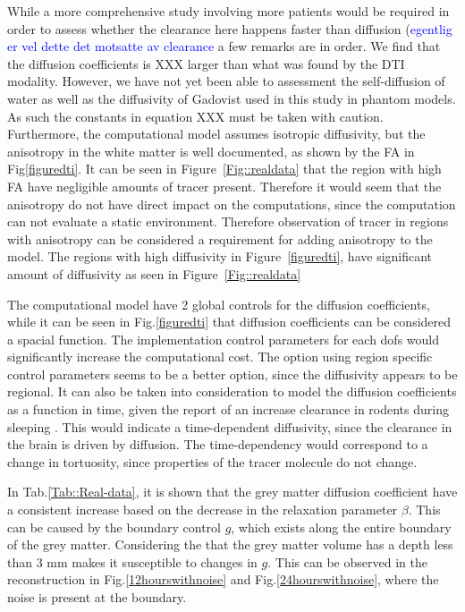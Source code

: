 \documentclass[11pt,a4paper]{article}
\newcommand{\kam}[1]{\textcolor{blue}{#1}}
\begin{document}
While a more comprehensive study involving more patients would be required in order to assess whether the clearance here happens faster than diffusion (\kam{egentlig er
vel dette det motsatte av clearance} a few remarks are in order. We find that the diffusion coefficients is XXX larger than what was found by the DTI modality.  
However, we have not yet been able to assessment the self-diffusion of water as well as the diffusivity of Gadovist used in this study in phantom models. As such 
the constants in equation XXX must be taken with caution. Furthermore,    
the computational model assumes isotropic diffusivity, but the anisotropy in the white matter is well documented, as shown by the FA in Fig\ref{figuredti}. It can be seen in Figure~\ref{Fig::realdata} that the region with high FA have negligible amounts of tracer present. Therefore it would seem that the anisotropy do not have direct impact on the computations, since the computation can not evaluate a static environment. Therefore  observation of tracer in regions with anisotropy can be considered a requirement for adding anisotropy to the model.
The regions with high diffusivity in Figure~\ref{figuredti},  have significant amount of diffusivity as seen in Figure~\ref{Fig::realdata} 


The computational model have 2 global controls for the diffusion coefficients, while it can be seen in  Fig.\ref{figuredti} that diffusion coefficients can be considered a spacial function. The implementation control parameters for each dofs would significantly increase the computational cost. The option using region specific control parameters seems to be a better option, since the diffusivity appears to be regional. It can also be taken into consideration to model the diffusion coefficients as a function in time, given the report of an increase clearance in rodents during sleeping \cite{xie2013sleep}. This would indicate a time-dependent diffusivity, since the clearance in the brain is driven by diffusion. The time-dependency would correspond to a change in tortuosity, since properties of the tracer molecule do not change.

In Tab.\ref{Tab::Real-data}, it is shown that the grey matter diffusion coefficient have a consistent increase based on the decrease in the relaxation parameter $\beta$. This can be caused by the boundary control $g$, which exists along the entire boundary of the grey matter. Considering the that the grey matter volume has a depth less than 3 mm makes it susceptible to changes in $g$. This can be observed in the reconstruction in Fig.\ref{12hourswithnoise} and Fig.\ref{24hourswithnoise}, where the noise is present at the boundary.
  
\end{document}
